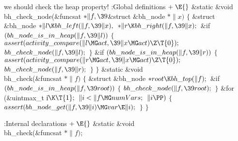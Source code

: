 we should check the heap property!
\Y\B\4:Global definitions\X${}\mathrel+\E{}$\6
\&{static} \&{void} \\{bh\_check\_node}(\&{funcsat} ${}{*}\|f,\39{}$\&{struct} %
\&{bh\_node} ${}{*}\|x){}$\1\1\2\2\6
${}\{{}$\1\6
\&{struct} \&{bh\_node} ${}{*}\|l\K\\{bh\_left}(\|f,\39\|x),{}$ ${}{*}\|r\K%
\\{bh\_right}(\|f,\39\|x);{}$\7
\&{if} ${}(\\{bh\_node\_is\_in\_heap}(\|f,\39\|l)){}$\5
${}\{{}$\1\6
${}\\{assert}(\\{activity\_compare}(\|l\MG\\{act},\39\|x\MG\\{act})\Z\T{0});{}$%
\6
${}\\{bh\_check\_node}(\|f,\39\|l);{}$\6
\4${}\}{}$\2\6
\&{if} ${}(\\{bh\_node\_is\_in\_heap}(\|f,\39\|r)){}$\5
${}\{{}$\1\6
${}\\{assert}(\\{activity\_compare}(\|r\MG\\{act},\39\|x\MG\\{act})\Z\T{0});{}$%
\6
${}\\{bh\_check\_node}(\|f,\39\|r);{}$\6
\4${}\}{}$\2\6
\4${}\}{}$\2\7
\&{static} \&{void} \\{bh\_check}(\&{funcsat} ${}{*}\|f){}$\1\1\2\2\6
${}\{{}$\1\6
\&{struct} \&{bh\_node} ${}{*}\\{root}\K\\{bh\_top}(\|f);{}$\7
\&{if} ${}(\\{bh\_node\_is\_in\_heap}(\|f,\39\\{root})){}$\5
${}\{{}$\1\6
${}\\{bh\_check\_node}(\|f,\39\\{root});{}$\6
\4${}\}{}$\2\6
\&{for} (\&{uintmax\_t} \|i${}\K\T{1};{}$ ${}\|i<\|f\MG\\{numVars};{}$ ${}\|i%
\PP){}$\5
${}\{{}$\1\6
${}\\{assert}(\\{bh\_node\_get}(\|f,\39\|i)\MG\\{var}\E\|i);{}$\6
\4${}\}{}$\2\6
\4${}\}{}$\2\par
\fi

\Y\B\4:Internal declarations\X${}\mathrel+\E{}$\6
\&{static} \&{void} \\{bh\_check}(\&{funcsat} ${}{*}\|f){}$;\par
\fi

